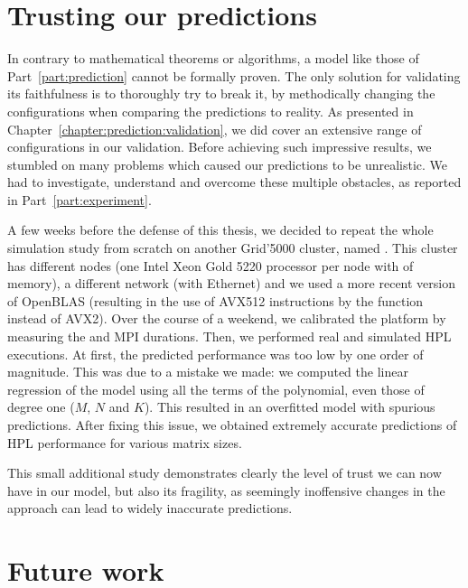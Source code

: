     \section{Trusting our predictions}%
    \label{sec:prediction_trust}

        In contrary to mathematical theorems or algorithms, a model like those of Part~\ref{part:prediction} cannot be
        formally proven. The only solution for validating its faithfulness is to thoroughly try to break it, by
        methodically changing the configurations when comparing the predictions to reality. As presented in
        Chapter~\ref{chapter:prediction:validation}, we did cover an extensive range of configurations in our
        validation. Before achieving such impressive results, we stumbled on many problems which caused our predictions
        to be unrealistic. We had to investigate, understand and overcome these multiple obstacles, as reported in
        Part~\ref{part:experiment}.

        A few weeks before the defense of this thesis, we decided to repeat the whole simulation study from scratch on
        another Grid'5000 cluster, named \gros. This cluster has different nodes (one Intel Xeon Gold 5220 processor per
        node with  of memory), a different network (with  Ethernet) and
        we used a more recent version of OpenBLAS (resulting in the use of AVX512 instructions by the \dgemm function
        instead of AVX2). Over the course of a weekend, we calibrated the platform by measuring the \dgemm and MPI
        durations. Then, we performed real and simulated HPL executions. At first, the predicted performance was too low
        by one order of magnitude. This was due to a mistake we made: we computed the linear regression of the \dgemm
        model using all the terms of the polynomial, even those of degree one (\ie \(M\), \(N\) and \(K\)). This
        resulted in an overfitted model with spurious predictions.  After fixing this issue, we obtained extremely
        accurate predictions of HPL performance for various matrix sizes.

        This small additional study demonstrates clearly the level of trust we can now have in our model, but also its
        fragility, as seemingly inoffensive changes in the approach can lead to widely inaccurate predictions.

    \section{Future work}%

